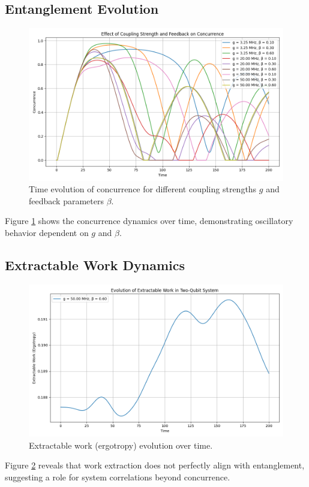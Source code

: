 \documentclass[a4paper,12pt]{article}
\begin{document}
\subsection{Entanglement Evolution}
\begin{figure}[h]
\centering
\includegraphics[width=0.7\linewidth]{Figure1.png}
\caption{Time evolution of concurrence for different coupling strengths $g$ and feedback parameters $\beta$.}
\label{fig:concurrence}
\end{figure}

Figure \ref{fig:concurrence} shows the concurrence dynamics over time, demonstrating oscillatory behavior 
dependent on $g$ and $\beta$.

\subsection{Extractable Work Dynamics}
\begin{figure}[h]
\centering
\includegraphics[width=0.7\linewidth]{Figure2.png}
\caption{Extractable work (ergotropy) evolution over time.}
\label{fig:ergotropy}
\end{figure}

Figure \ref{fig:ergotropy} reveals that work extraction does not perfectly align with entanglement, 
suggesting a role for system correlations beyond concurrence.
\end{document}
